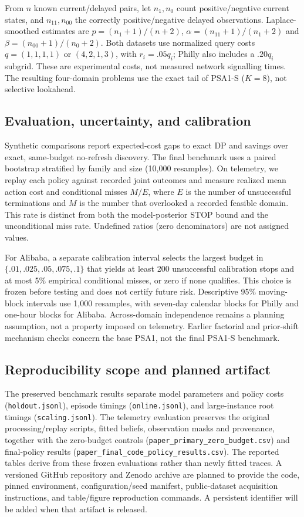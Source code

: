 \documentclass[conference]{IEEEtran}
\begin{document}
From $n$ known current/delayed pairs, let $n_1,n_0$ count positive/negative current states, and $n_{11},n_{00}$ the correctly positive/negative delayed observations. Laplace-smoothed estimates are $p=(n_1+1)/(n+2)$, $\alpha=(n_{11}+1)/(n_1+2)$ and $\beta=(n_{00}+1)/(n_0+2)$. Both datasets use normalized query costs $q=(1,1,1,1)$ or $(4,2,1,3)$, with $r_i=.05q_i$; Philly also includes a $.20q_i$ subgrid. These are experimental costs, not measured network signalling times. The resulting four-domain problems use the exact tail of PSA1-S ($K=8$), not selective lookahead.

\subsection{Evaluation, uncertainty, and calibration}
Synthetic comparisons report expected-cost gaps to exact DP and savings over exact, same-budget no-refresh discovery. The final benchmark uses a paired bootstrap stratified by family and size (10,000 resamples). On telemetry, we replay each policy against recorded joint outcomes and measure realized mean action cost and conditional misses $M/E$, where $E$ is the number of unsuccessful terminations and $M$ is the number that overlooked a recorded feasible domain. This rate is distinct from both the model-posterior STOP bound and the unconditional miss rate. Undefined ratios (zero denominators) are not assigned values.

For Alibaba, a separate calibration interval selects the largest budget in $\{.01,.025,.05,.075,.1\}$ that yields at least 200 unsuccessful calibration stops and at most 5\% empirical conditional misses, or zero if none qualifies. This choice is frozen before testing and does not certify future risk. Descriptive 95\% moving-block intervals use 1,000 resamples, with seven-day calendar blocks for Philly and one-hour blocks for Alibaba. Across-domain independence remains a planning assumption, not a property imposed on telemetry. Earlier factorial and prior-shift mechanism checks concern the base PSA1, not the final PSA1-S benchmark.

\subsection{Reproducibility scope and planned artifact}
The preserved benchmark results separate model parameters and policy costs (\texttt{holdout.jsonl}), episode timings (\texttt{online.jsonl}), and large-instance root timings (\texttt{scaling.jsonl}). The telemetry evaluation preserves the original processing/replay scripts, fitted beliefs, observation masks and provenance, together with the zero-budget controls (\texttt{paper\_primary\_zero\_budget.csv}) and final-policy results (\texttt{paper\_final\_code\_policy\_results.csv}). The reported tables derive from these frozen evaluations rather than newly fitted traces. A versioned GitHub repository and Zenodo archive are planned to provide the code, pinned environment, configuration/seed manifest, public-dataset acquisition instructions, and table/figure reproduction commands. A persistent identifier will be added when that artifact is released.
\end{document}
